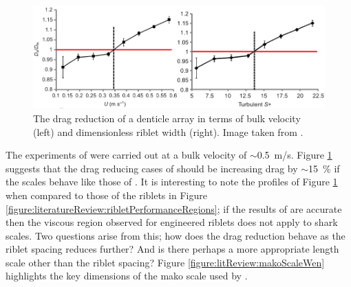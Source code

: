 \documentclass[12pt,oneside,a4paper]{article}
\begin{document}
%
\begin{figure}[!b]
\centering
\includegraphics[width=15cm]{images/litReview/sharkScaleDragProfile1.png}
\caption{The drag reduction of a denticle array in terms of bulk velocity (left) and dimensionless riblet width (right). Image taken from \cite{wen2014}.}
\label{figure:literatureReview:dragProfileSharkScales}
\end{figure}
%
The experiments of \cite{fletcher2014phd} were carried out at a bulk velocity of $\sim$\SI{0.5}{m/s}. Figure \ref{figure:literatureReview:dragProfileSharkScales} suggests that the drag reducing cases of \cite{fletcher2014phd} should be increasing drag by $\sim$\SI{15}{\%} if the scales behave like those of \cite{wen2014}. It is interesting to note the profiles of Figure \ref{figure:literatureReview:dragProfileSharkScales} when compared to those of the riblets in Figure \ref{figure:literatureReview:ribletPerformanceRegions}; if the results of \cite{wen2014} are accurate then the viscous region observed for engineered riblets does not apply to shark scales. Two questions arise from this; how does the drag reduction behave as the riblet spacing reduces further? And is there perhaps a more appropriate length scale other than the riblet spacing? Figure \ref{figure:litReview:makoScaleWen} highlights the key dimensions of the mako scale used by \cite{wen2014}.
%
\end{document}
